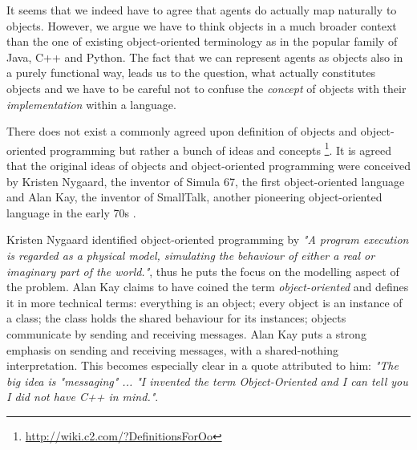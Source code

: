It seems that we indeed have to agree that agents do actually map naturally to objects. However, we argue we have to think objects in a much broader context than the one of existing object-oriented terminology as in the popular family of Java, C++ and Python. The fact that we can represent agents as objects also in a purely functional way, leads us to the question, what actually constitutes objects and we have to be careful not to confuse the \textit{concept} of objects with their \textit{implementation} within a language.

\medskip

There does not exist a commonly agreed upon definition of objects and object-oriented programming but rather a bunch of ideas and concepts \footnote{\url{http://wiki.c2.com/?DefinitionsForOo}}. It is agreed that the original ideas of objects and object-oriented programming were conceived by Kristen Nygaard, the inventor of Simula 67, the first object-oriented language \cite{dahl_birth_2002} and Alan Kay, the inventor of SmallTalk, another pioneering object-oriented language in the early 70s \cite{kay_early_1993}. %

Kristen Nygaard identified object-oriented programming by \textit{"A program execution is regarded as a physical model, simulating the behaviour of either a real or imaginary part of the world."}, thus he puts the focus on the modelling aspect of the problem. Alan Kay claims to have coined the term \textit{object-oriented} and defines it in more technical terms: everything is an object; every object is an instance of a class; the class holds the shared behaviour for its instances; objects communicate by sending and receiving messages. Alan Kay puts a strong emphasis on sending and receiving messages, with a shared-nothing interpretation. This becomes especially clear in a quote attributed to him: \textit{"The big idea is "messaging" ... "I invented the term Object-Oriented and I can tell you I did not have C++ in mind."}.

\medskip


